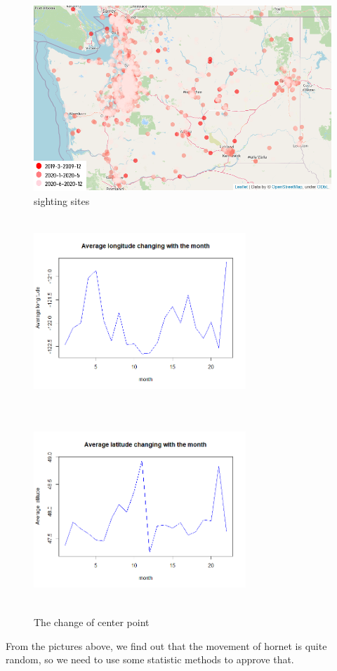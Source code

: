 \documentclass[12pt]{article}
\begin{document}
\begin{figure}[H]
	\centering
	\includegraphics[width=14cm,height=7cm]{./pictures/distribute1.png}
	\caption{sighting sites}
\end{figure}

\begin{figure}[H]
	\small
	\centering
	\begin{minipage}{8cm}
		\includegraphics[width=8cm,height=7cm]{./pictures/longtitude.png}
		\label{nt}
	\end{minipage}
	\begin{minipage}{8cm}
		\includegraphics[width=8cm,height=7cm]{./pictures/latitude.png}
		\label{nt}
	\end{minipage}
	\caption{The change of center point}
\end{figure}
From the pictures above, we find out that the movement of hornet is quite random, so we need to use some statistic methods to approve that.
\end{document}
